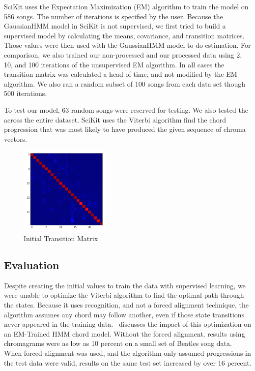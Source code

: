 \documentclass{article}
\begin{document}
SciKit uses the Expectation Maximization (EM) algorithm to train the model on
586 songs. The number of iterations is specified by the user. Because the
GaussianHMM model in SciKit is not supervised, we first tried to build a
supervised model by calculating the means, covariance, and transition matrices.
Those values were then used with the GaussianHMM model to do estimation.  For
comparison, we also trained our non-processed and our processed data using 2,
10, and 100 iterations of the unsupervised EM algorithm. In all cases the
transition matrix was calculated a head of time, and not modified by the EM
algorithm.  We also ran a random subset of 100 songs from each data set though
500 iterations.

To test our model, 63 random songs were reserved for testing. We also tested
the across the entire dataset. SciKit uses the Viterbi algorithm find the chord
progression that was most likely to have produced the given sequence of chroma
vectors.

\begin{figure}
   \centering
   \includegraphics[width=0.4\textwidth]{trans-h.png}
   \caption{Initial Transition Matrix}\label{fig:transmath}
\end{figure}

\subsection{Evaluation}

Despite creating the initial values to train the data with supervised learning,
we were unable to optimize the Viterbi algorithm to find the optimal path
through the states. Because it uses recognition, and not a forced alignment
technique, the algorithm assumes any chord may follow another, even if those
state transitions never appeared in the training data.~\cite{Danellis:23}
discusses the impact of this optimization on an EM-Trained HMM chord model.
Without the forced alignment, results using chromagrams were as low as 10
percent on a small set of Beatles song data. When forced alignment was used,
and the algorithm only assumed progressions in the test data were valid,
results on the same test set increased by over 16 percent.
\end{document}
